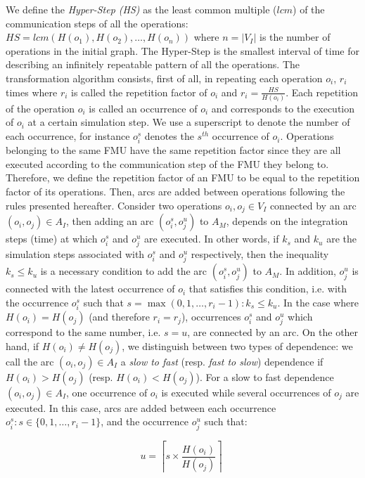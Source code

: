 We define the \textit{Hyper-Step (HS)} as the least common multiple ($lcm$) of the communication steps of all the operations: $HS=lcm(H(o_1),H(o_2), \dots ,H(o_n))$ where $n = |V_I|$ is the number of operations in the initial graph. The Hyper-Step is the smallest interval of time for describing an infinitely repeatable pattern of all the operations. The transformation algorithm consists, first of all, in repeating each operation $o_i$, $r_i$ times where $r_i$ is called the repetition factor of $o_i$ and $r_i = \frac{HS}{H(o_i)}$. Each repetition of the operation $o_i$ is called an occurrence of $o_i$ and corresponds to the execution of $o_i$ at a certain simulation step. We use a superscript to denote the number of each occurrence, for instance $o_i^s$ denotes the $s^{th}$ occurrence of $o_i$. Operations belonging to the same FMU have the same repetition factor since they are all executed according to the communication step of the FMU they belong to. Therefore, we define the repetition factor of an FMU to be equal to the repetition factor of its operations. Then, arcs are added between operations following the rules presented hereafter. Consider two operations $o_i, o_j \in V_I$ connected by an arc $(o_i,o_j) \in A_I$, then adding an arc $(o_i^s,o_j^u)$ to $A_M$, depends on the integration steps (time) at which $o_i^s$ and $o_j^u$ are executed. In other words, if $k_{s}$ and $k_{u}$ are the simulation steps associated with $o_i^s$ and $o_j^u$ respectively, then the inequality $k_{s} \leq k_{u}$ is a necessary condition to add the arc $(o_i^s,o_j^u)$ to $A_M$. In addition, $o_j^u$ is connected with the latest occurrence of $o_i$ that satisfies this condition, i.e. with the occurrence $o_i^s$ such that $s=\max(0,1, \dots ,r_i-1) : k_{s} \leq k_{u}$. In the case where $H(o_i) = H(o_j)$ (and therefore $r_i = r_j$), occurrences $o_i^s$ and $o_j^u$ which correspond to the same number, i.e. $s = u$, are connected by an arc. On the other hand, if $H(o_i) \neq H(o_j)$, we distinguish between two types of dependence: we call the arc $(o_i,o_j) \in A_I$ a \textit{slow to fast} (resp. \textit{fast to slow}) dependence if $H(o_i) > H(o_j)$ (resp. $H(o_i) < H(o_j)$). For a slow to fast dependence $(o_i,o_j) \in A_I$, one occurrence of $o_i$ is executed while several occurrences of $o_j$ are executed. In this case, arcs are added between each occurrence $o_i^s: s \in \{0,1, \dots ,r_i-1\}$, and the occurrence $o_j^u$ such that:

\begin{equation}
u = \left \lceil{s \times \frac{H(o_i)}{H(o_j)}}\right \rceil\;
\end{equation}

